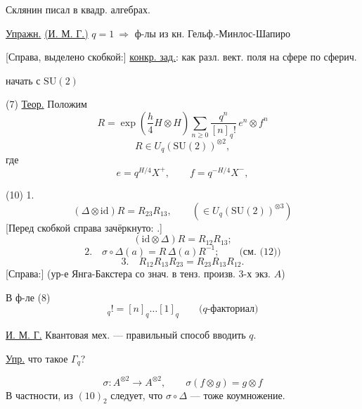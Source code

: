 Склянин писал в квадр. алгебрах.

\underline{Упражн.} \underline{(И. М. Г.)} $q=1\ \Rightarrow$ ф-лы из кн. Гельф.-Минлос-Шапиро

[Справа, выделено скобкой:] \underline{конкр. зад.}: как разл. вект. поля на сфере по сферич. 

начать с $\mathrm{SU}(2)$

(7) \underline{Теор.} Положим
\begin{equation*}
R=\exp\left(\frac h4 H\otimes H\right)
\sum_{n\ge0}\frac{q^n}{[n]_q!}\,e^n\otimes f^n
\tag{8}
\end{equation*}
\begin{equation*}
R\in U_q(\mathrm{SU}(2))^{\otimes2},
\end{equation*}
где
\begin{equation*}
e=q^{H/4}X^+,\qquad f=q^{-H/4}X^-,
\tag{9}
\end{equation*}

(10) 1.
\begin{equation*}
(\Delta\otimes\mathrm{id})R=R_{23}R_{13},
\qquad (\in U_q(\mathrm{SU}(2))^{\otimes3})
\end{equation*}
[Перед скобкой справа зачёркнуто: .]
\begin{equation*}
(\mathrm{id}\otimes\Delta)R=R_{12}R_{13};
\end{equation*}
\begin{equation*}
2.\quad \sigma\circ\Delta(a)=R\,\Delta(a)R^{-1};\qquad\text{(см. (12))}
\end{equation*}
\begin{equation*}
3.\quad R_{12}R_{13}R_{23}=R_{23}R_{13}R_{12}.
\end{equation*}
[Справа:] (ур-е Янга-Бакстера со знач. в тенз. произв. 3-х экз. $A$)

В ф-ле (8)
\begin{equation*}
[n]_q!=[n]_q\ldots[1]_q\qquad\text{($q$-факториал)}
\tag{11}
\end{equation*}

\underline{И. М. Г.} Квантовая мех. — правильный способ вводить $q$.

\underline{\underline{Упр.}} что такое $\Gamma_q$?

\begin{equation*}
\sigma\colon A^{\otimes2}\longrightarrow A^{\otimes2},\qquad
\sigma(f\otimes g)=g\otimes f
\tag{12}
\end{equation*}
В частности, из $(10)_2$ следует, что $\sigma\circ\Delta$ — тоже коумножение.


